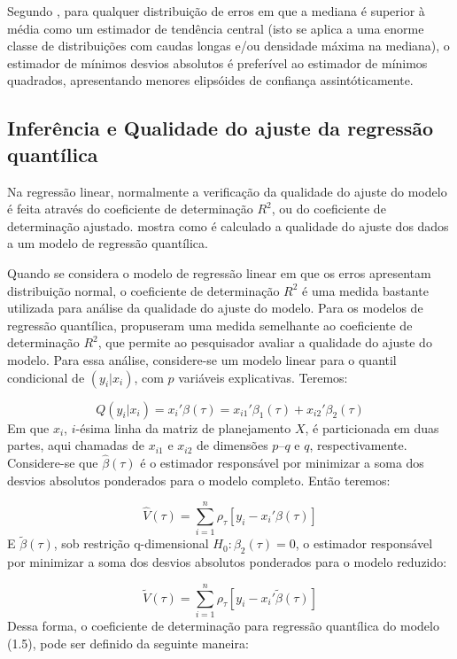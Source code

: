 \documentclass[a4paper, 12pt]{article}
\begin{document}
Segundo \textcite[p.~618]{basset}, para qualquer distribuição de erros
em que a mediana é superior à média como um estimador de tendência
central (isto se aplica a uma enorme classe de distribuições com caudas
longas e/ou densidade máxima na mediana), o estimador de mínimos desvios
absolutos é preferível ao estimador de mínimos quadrados, apresentando
menores elipsóides de confiança assintóticamente.

\hypertarget{inferencia-e-qualidade-do-ajuste-da-regressao-quantilica}{%
\subsection{Inferência e Qualidade do ajuste da regressão
quantílica}\label{inferencia-e-qualidade-do-ajuste-da-regressao-quantilica}}

Na regressão linear, normalmente a verificação da qualidade do ajuste do
modelo é feita através do coeficiente de determinação \(R^2\), ou do
coeficiente de determinação ajustado. \textcite{r1} mostra como é
calculado a qualidade do ajuste dos dados a um modelo de regressão
quantílica.

Quando se considera o modelo de regressão linear em que os erros
apresentam distribuição normal, o coeficiente de determinação \(R^2\) é
uma medida bastante utilizada para análise da qualidade do ajuste do
modelo. Para os modelos de regressão quantílica, \textcite{r1}
propuseram uma medida semelhante ao coeficiente de determinação \(R^2\),
que permite ao pesquisador avaliar a qualidade do ajuste do modelo. Para
essa análise, considere-se um modelo linear para o quantil condicional
de \((y_i | x_i)\), com \(p\) variáveis explicativas. Teremos:

\[Q(y_i | x_i) = x_i' \beta(\tau) = x_{i1}' \beta_1(\tau) + x_{i2}' \beta_2(\tau)\]
Em que \(x_i\), \(i\)-ésima linha da matriz de planejamento \(X\), é
particionada em duas partes, aqui chamadas de \(x_{i1}\) e \(x_{i2}\) de
dimensões \(p – q\) e \(q\), respectivamente. Considere-se que
\(\hat \beta(\tau)\) é o estimador responsável por minimizar a soma dos
desvios absolutos ponderados para o modelo completo. Então teremos:

\[\hat V(\tau) = \sum_{i=1}^n \rho_\tau [y_i - x_i'\beta(\tau)]\] E
\(\tilde \beta(\tau)\), sob restrição q-dimensional
\(H_0: \beta_2(\tau)=0\), o estimador responsável por minimizar a soma
dos desvios absolutos ponderados para o modelo reduzido:

\[\tilde V(\tau) = \sum_{i=1}^n \rho_\tau [y_i - x_i' \tilde \beta(\tau)]\]
Dessa forma, o coeficiente de determinação para regressão quantílica do
modelo (1.5), pode ser definido da seguinte maneira:
\end{document}
